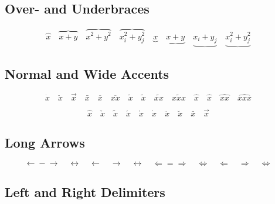 	\subsection{Over- and Underbraces \showfamily}

	\begin{displaymath}
	  \overbrace{x} \quad
	  \overbrace{x+y} \quad
	  \overbrace{x^{2}+y^{2}} \quad
	  \overbrace{x_{i}^{2}+y_{j}^{2}} \quad
	  \underbrace{x} \quad
	  \underbrace{x+y} \quad
	  \underbrace{x_{i}+y_{j}} \quad
	  \underbrace{x_{i}^{2}+y_{j}^{2}} \quad
	\end{displaymath}

	\subsection{Normal and Wide Accents \showfamily}

	\begin{displaymath}
	  \dot{x} \quad
	  \ddot{x} \quad
	  \vec{x} \quad
	  \bar{x} \quad
	  \overline{x} \quad
	  \overline{xx} \quad
	  \tilde{x} \quad
	  \widetilde{x} \quad
	  \widetilde{xx} \quad
	  \widetilde{xxx} \quad
	  \hat{x} \quad
	  \widehat{x} \quad
	  \widehat{xx} \quad
	  \widehat{xxx} \quad
	\end{displaymath}

	\begin{displaymath}
	  \hat{x} \quad
	  \check{x} \quad
	  \tilde{x} \quad
	  \acute{x} \quad
	  \grave{x} \quad
	  \dot{x} \quad
	  \ddot{x} \quad
	  \breve{x} \quad
	  \bar{x} \quad
	  \vec{x} \quad
	\end{displaymath}

	\subsection{Long Arrows \showfamily}

	\begin{displaymath}
	  \leftarrow \mathrel{-} \rightarrow \quad
	  \leftrightarrow \quad
	  \longleftarrow  \quad
	  \longrightarrow \quad
	  \longleftrightarrow \quad
	  \Leftarrow = \Rightarrow \quad
	  \Leftrightarrow \quad
	  \Longleftarrow  \quad
	  \Longrightarrow \quad
	  \Longleftrightarrow \quad
	\end{displaymath}

	\subsection{Left and Right Delimiters \showfamily}

